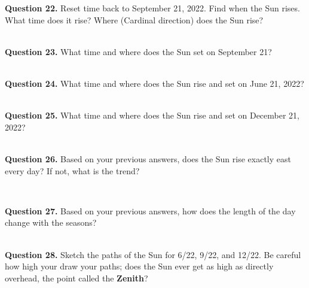 \documentclass[11pt]{article}
\begin{document}
	\textbf{Question 22.} Reset time back to September 21, 2022. Find when the Sun rises. What time does it rise? Where (Cardinal direction) does the Sun rise?\\
	\vspace*{1.5cm}
	
	\hrulefill\\
	
	\textbf{Question 23.} What time and where does the Sun set on September 21?\\
	\vspace*{1.5cm}
	
	\hrulefill\\
	
	\textbf{Question 24.} What time and where does the Sun rise and set on June 21, 2022?\\
	\vspace*{1.5cm}
	
	\hrulefill\\
	
	\textbf{Question 25.} What time and where does the Sun rise and set on December 21, 2022?\\
	\vspace*{1.5cm}
	
	\hrulefill\\
	
	\textbf{Question 26.} Based on your previous answers, does the Sun rise exactly east every day? If not, what is the trend?\\
	\vspace*{1.5cm}
	
	\hrulefill\\
	
	\newpage
	
	\textbf{Question 27.} Based on your previous answers, how does the length of the day change with the seasons? \\
	\vspace*{1.5cm}
	
	\hrulefill\\
	
	\textbf{Question 28.} Sketch the paths of the Sun for 6/22, 9/22, and 12/22. Be careful how high your draw your paths; does the Sun ever get as high as directly overhead, the point called the \textbf{Zenith}? \\
	\vspace*{1.5cm}
	
\end{document}
